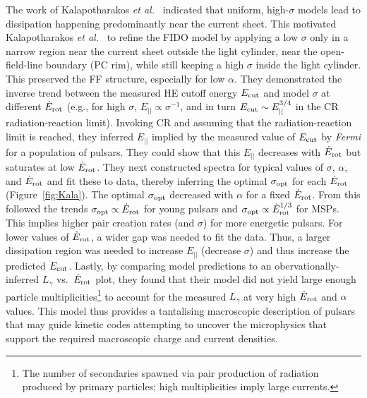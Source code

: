 \documentclass{PoS}
\begin{document}
The work of Kalapotharakos \textit{et al.}~\cite{Kalapotharakos14} indicated that uniform, high-$\sigma$ models lead to dissipation happening predominantly near the current sheet. This motivated Kalapotharakos \textit{et al.}~\cite{Kalapotharakos17a} to refine the FIDO model by applying a low $\sigma$ only in a narrow region near the current sheet outside the light cylinder, near the open-field-line boundary (PC rim), while still keeping a high $\sigma$ inside the light cylinder. This preserved the FF structure, especially for low $\alpha$. They demonstrated the inverse trend between the measured HE cutoff energy $E_{\rm cut}$ and model $\sigma$ at different $\dot{E}_{\rm rot}$ (e.g., for high $\sigma$, $E_{||}\propto\sigma^{-1}$, and in turn $E_{\rm cut}\sim E^{3/4}_{||}$ in the CR radiation-reaction limit). Invoking CR and assuming that the radiation-reaction limit is reached, they inferred $E_{||}$ implied by the measured value of $E_{\rm cut}$ by \textit{Fermi} for a population of pulsars. They could show that this $E_{||}$ decreases with $\dot{E}_{\rm rot}$ but saturates at low $\dot{E}_{\rm rot}$. They next constructed spectra for typical values of $\sigma$, $\alpha$, and $\dot{E}_{\rm rot}$ and fit these to data, thereby inferring the optimal $\sigma_{\rm opt}$ for each $\dot{E}_{\rm rot}$ (Figure~\ref{fig:Kala}). The optimal $\sigma_{\rm opt}$ decreased with $\alpha$ for a fixed $\dot{E}_{\rm rot}$. From this followed the trends $\sigma_{\rm opt}\propto\dot{E}_{\rm rot}$ for young pulsars and $\sigma_{\rm opt}\propto\dot{E}_{\rm rot}^{1/3}$ for MSPs. This implies higher pair creation rates (and $\sigma$) for more energetic pulsars. For lower values of $\dot{E}_{\rm rot}$, a wider gap was needed to fit the data. Thus, a larger dissipation region was needed to increase $E_{||}$ (decrease $\sigma$) and thus increase the predicted $E_{\rm cut}$. Lastly, by comparing model predictions to an obervationally-inferred $L_\gamma$ vs.\ $\dot{E}_{\rm rot}$ plot, they found that their model did not yield large enough particle multiplicities\footnote{The number of secondaries spawned via pair production of radiation produced by primary particles; high multiplicities imply large currents.} to account for the measured $L_\gamma$ at very high $\dot{E}_{\rm rot}$ and $\alpha$ values. This model thus provides a tantalising macroscopic description of pulsars that may guide kinetic codes attempting to uncover the microphysics that support the required macroscopic charge and current densities. 
\end{document}
